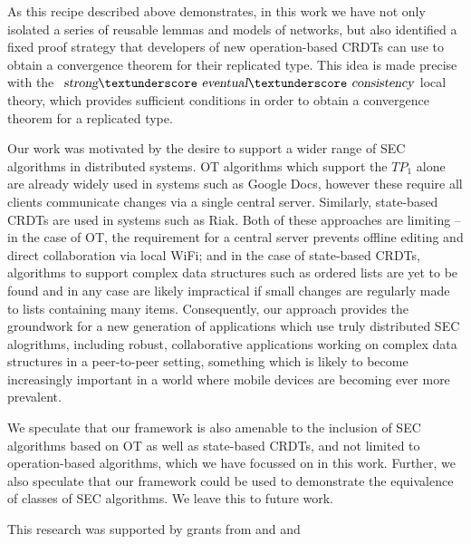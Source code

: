 \documentclass[acmlarge,review,anonymous]{acmart}\settopmatter{printfolios=true}
\begin{document}
As this recipe described above demonstrates, in this work we have not only isolated a series of reusable lemmas and models of networks, but also identified a fixed proof strategy that developers of new operation-based CRDTs can use to obtain a convergence theorem for their replicated type.
This idea is made precise with the $\isa{strong}{\isacharunderscore}\isa{eventual}{\isacharunderscore}\isa{consistency}$ local theory, which provides sufficient conditions in order to obtain a convergence theorem for a replicated type.

Our work was motivated by the desire to support a wider range of SEC algorithms in distributed systems.
OT algorithms which support the $\mathit{TP}_1$ alone are already widely used in systems such as Google Docs, however these require all clients communicate changes via a single central server.
Similarly, state-based CRDTs are used in systems such as Riak. Both of these approaches are limiting -- in the case of OT, the requirement for a central server prevents offline editing and direct collaboration via local WiFi; and in the case of state-based CRDTs, algorithms to support complex data structures such as ordered lists are yet to be found and in any case are likely impractical if small changes are regularly made to lists containing many items.
Consequently, our approach provides the groundwork for a new generation of applications which use truly distributed SEC alogrithms, including robust, collaborative applications working on complex data structures in a peer-to-peer setting, something which is likely to become increasingly important in a world where mobile devices are becoming ever more prevalent.

We speculate that our framework is also amenable to the inclusion of SEC algorithms based on OT as well as state-based CRDTs, and not limited to operation-based algorithms, which we have focussed on in this work.
Further, we also speculate that our framework could be used to demonstrate the equivalence of classes of SEC algorithms.
We leave this to future work.

\begin{acks}
    This research was supported by grants from
     and
     and

\end{acks}

{}
\end{document}

